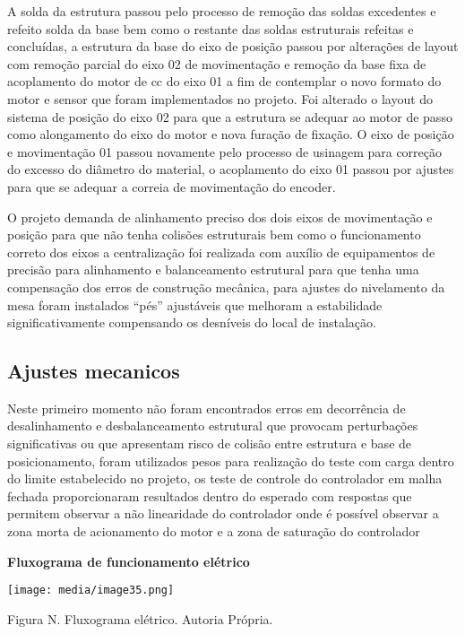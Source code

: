 \documentclass[]{article}
\begin{document}
A solda da estrutura passou pelo processo de remoção das soldas
excedentes e refeito solda da base bem como o restante das soldas
estruturais refeitas e concluídas, a estrutura da base do eixo de
posição passou por alterações de layout com remoção parcial do eixo 02
de movimentação e remoção da base fixa de acoplamento do motor de cc do
eixo 01 a fim de contemplar o novo formato do motor e sensor que foram
implementados no projeto. Foi alterado o layout do sistema de posição do
eixo 02 para que a estrutura se adequar ao motor de passo como
alongamento do eixo do motor e nova furação de fixação. O eixo de
posição e movimentação 01 passou novamente pelo processo de usinagem
para correção do excesso do diâmetro do material, o acoplamento do eixo
01 passou por ajustes para que se adequar a correia de movimentação do
encoder.

O projeto demanda de alinhamento preciso dos dois eixos de movimentação
e posição para que não tenha colisões estruturais bem como o
funcionamento correto dos eixos a centralização foi realizada com
auxílio de equipamentos de precisão para alinhamento e balanceamento
estrutural para que tenha uma compensação dos erros de construção
mecânica, para ajustes do nivelamento da mesa foram instalados ``pés''
ajustáveis que melhoram a estabilidade significativamente compensando os
desníveis do local de instalação.

\subsection{Ajustes mecanicos}\label{ajustes-mecanicos}

Neste primeiro momento não foram encontrados erros em decorrência de
desalinhamento e desbalanceamento estrutural que provocam perturbações
significativas ou que apresentam risco de colisão entre estrutura e base
de posicionamento, foram utilizados pesos para realização do teste com
carga dentro do limite estabelecido no projeto, os teste de controle do
controlador em malha fechada proporcionaram resultados dentro do
esperado com respostas que permitem observar a não linearidade do
controlador onde é possível observar a zona morta de acionamento do
motor e a zona de saturação do controlador

\textbf{Fluxograma de funcionamento elétrico}

\texttt{[image: media/image35.png]}

Figura N. Fluxograma elétrico. Autoria Própria.
\end{document}
